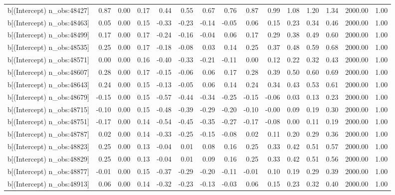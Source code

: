 \begin{table}[ht]
\begin{tabular}{rrrrrrrrrrrrrrr}
  b[(Intercept) n\_obs:48427] & 0.87 & 0.00 & 0.17 & 0.44 & 0.55 & 0.67 & 0.76 & 0.87 & 0.99 & 1.08 & 1.20 & 1.34 & 2000.00 & 1.00 \\ 
  b[(Intercept) n\_obs:48463] & 0.05 & 0.00 & 0.15 & -0.33 & -0.23 & -0.14 & -0.05 & 0.06 & 0.15 & 0.23 & 0.34 & 0.46 & 2000.00 & 1.00 \\ 
  b[(Intercept) n\_obs:48499] & 0.17 & 0.00 & 0.17 & -0.24 & -0.16 & -0.04 & 0.06 & 0.17 & 0.29 & 0.38 & 0.49 & 0.60 & 2000.00 & 1.00 \\ 
  b[(Intercept) n\_obs:48535] & 0.25 & 0.00 & 0.17 & -0.18 & -0.08 & 0.03 & 0.14 & 0.25 & 0.37 & 0.48 & 0.59 & 0.68 & 2000.00 & 1.00 \\ 
  b[(Intercept) n\_obs:48571] & 0.00 & 0.00 & 0.16 & -0.40 & -0.33 & -0.21 & -0.11 & 0.00 & 0.12 & 0.22 & 0.32 & 0.43 & 2000.00 & 1.00 \\ 
  b[(Intercept) n\_obs:48607] & 0.28 & 0.00 & 0.17 & -0.15 & -0.06 & 0.06 & 0.17 & 0.28 & 0.39 & 0.50 & 0.60 & 0.69 & 2000.00 & 1.00 \\ 
  b[(Intercept) n\_obs:48643] & 0.24 & 0.00 & 0.15 & -0.13 & -0.05 & 0.06 & 0.14 & 0.24 & 0.34 & 0.43 & 0.53 & 0.61 & 2000.00 & 1.00 \\ 
  b[(Intercept) n\_obs:48679] & -0.15 & 0.00 & 0.15 & -0.57 & -0.44 & -0.34 & -0.25 & -0.15 & -0.06 & 0.03 & 0.13 & 0.23 & 2000.00 & 1.00 \\ 
  b[(Intercept) n\_obs:48715] & -0.10 & 0.00 & 0.15 & -0.48 & -0.39 & -0.29 & -0.20 & -0.10 & -0.00 & 0.09 & 0.19 & 0.30 & 2000.00 & 1.00 \\ 
  b[(Intercept) n\_obs:48751] & -0.17 & 0.00 & 0.14 & -0.54 & -0.45 & -0.35 & -0.27 & -0.17 & -0.08 & 0.00 & 0.11 & 0.19 & 2000.00 & 1.00 \\ 
  b[(Intercept) n\_obs:48787] & 0.02 & 0.00 & 0.14 & -0.33 & -0.25 & -0.15 & -0.08 & 0.02 & 0.11 & 0.20 & 0.29 & 0.36 & 2000.00 & 1.00 \\ 
  b[(Intercept) n\_obs:48823] & 0.25 & 0.00 & 0.13 & -0.04 & 0.01 & 0.08 & 0.16 & 0.25 & 0.33 & 0.42 & 0.51 & 0.57 & 2000.00 & 1.00 \\ 
  b[(Intercept) n\_obs:48829] & 0.25 & 0.00 & 0.13 & -0.04 & 0.01 & 0.09 & 0.16 & 0.25 & 0.33 & 0.42 & 0.51 & 0.56 & 2000.00 & 1.00 \\ 
  b[(Intercept) n\_obs:48877] & -0.01 & 0.00 & 0.15 & -0.37 & -0.29 & -0.20 & -0.11 & -0.01 & 0.10 & 0.19 & 0.29 & 0.39 & 2000.00 & 1.00 \\ 
  b[(Intercept) n\_obs:48913] & 0.06 & 0.00 & 0.14 & -0.32 & -0.23 & -0.13 & -0.03 & 0.06 & 0.15 & 0.23 & 0.32 & 0.40 & 2000.00 & 1.00 \\ 

\end{tabular}
\end{table}
